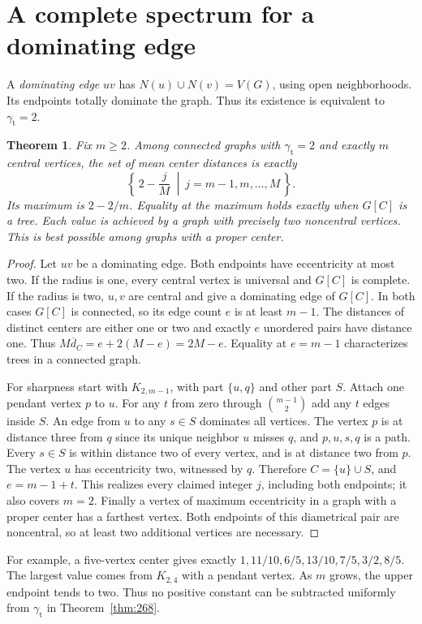 \documentclass[11pt]{article}
\newtheorem{thm}{Theorem}[section]
\newcommand{\gt}{\gamma_{\mathrm t}}
\newcommand{\av}{\overline d_C}
\begin{document}
\section{A complete spectrum for a dominating edge}
A \emph{dominating edge} $uv$ has $N(u)\cup N(v)=V(G)$, using open
neighborhoods. Its endpoints totally dominate the graph. Thus its existence
is equivalent to $\gt=2$.

\begin{thm}\label{thm:spectrum}
Fix $m\ge2$. Among connected graphs with $\gt=2$ and exactly $m$ central
vertices, the set of mean center distances is exactly
\[
  \left\{\,2-\frac{j}{M}\ \middle|\ j=m-1,m,\ldots,M\,\right\}.
\]
Its maximum is $2-2/m$. Equality at the maximum holds exactly when
$G[C]$ is a tree. Each value is achieved by a graph with precisely two
noncentral vertices. This is best possible among graphs with a proper center.
\end{thm}
\begin{proof}
Let $uv$ be a dominating edge. Both endpoints have eccentricity at most
two. If the radius is one, every central vertex is universal and $G[C]$
is complete. If the radius is two, $u,v$ are central and give a dominating
edge of $G[C]$. In both cases $G[C]$ is connected, so its edge count $e$
is at least $m-1$. The distances of distinct centers are either one or two
and exactly $e$ unordered pairs have distance one. Thus
$M\av=e+2(M-e)=2M-e$. Equality at $e=m-1$ characterizes trees in a
connected graph.

For sharpness start with $K_{2,m-1}$, with part $\{u,q\}$ and other part
$S$. Attach one pendant vertex $p$ to $u$. For any $t$ from zero through
$\binom{m-1}{2}$ add any $t$ edges inside $S$. An edge from $u$ to any
$s\in S$ dominates all vertices. The vertex $p$ is at distance three from
$q$ since its unique neighbor $u$ misses $q$, and $p,u,s,q$ is a path.
Every $s\in S$ is within distance two of every vertex, and is at distance
two from $p$. The vertex $u$ has eccentricity two, witnessed by $q$.
Therefore $C=\{u\}\cup S$, and $e=m-1+t$. This realizes every claimed
integer $j$, including both endpoints; it also covers $m=2$.
Finally a vertex of maximum eccentricity in a graph with a proper center
has a farthest vertex. Both endpoints of this diametrical pair are
noncentral, so at least two additional vertices are necessary.
\end{proof}

For example, a five-vertex center gives exactly $1,11/10,6/5,13/10,7/5,
3/2,8/5$. The largest value comes from $K_{2,4}$ with a pendant vertex.
As $m$ grows, the upper endpoint tends to two. Thus no positive constant
can be subtracted uniformly from $\gt$ in Theorem~\ref{thm:268}.
\end{document}
